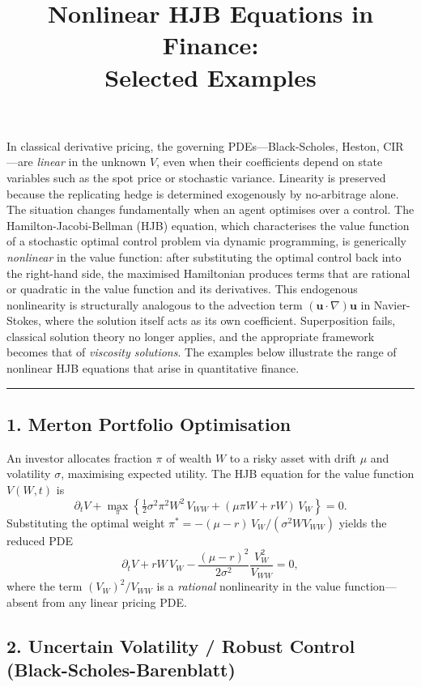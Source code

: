 \documentclass[11pt,a4paper]{article}
\title{\textbf{Nonlinear HJB Equations in Finance:\\Selected Examples}}
\author{}
\date{}
\begin{document}
\maketitle
\thispagestyle{empty}
\vspace{-1.5em}

\noindent
In classical derivative pricing, the governing PDEs---Black-Scholes, Heston, CIR---are \emph{linear} in the
unknown $V$, even when their coefficients depend on state variables such as the spot price or stochastic
variance. Linearity is preserved because the replicating hedge is determined exogenously by no-arbitrage
alone. The situation changes fundamentally when an agent optimises over a control. The Hamilton-Jacobi-Bellman
(HJB) equation, which characterises the value function of a stochastic optimal control problem via dynamic
programming, is generically \emph{nonlinear} in the value function: after substituting the optimal control
back into the right-hand side, the maximised Hamiltonian produces terms that are rational or quadratic in
the value function and its derivatives. This endogenous nonlinearity is structurally analogous to the
advection term $(\mathbf{u}\cdot\nabla)\mathbf{u}$ in Navier-Stokes, where the solution itself acts as its
own coefficient. Superposition fails, classical solution theory no longer applies, and the appropriate
framework becomes that of \emph{viscosity solutions}. The examples below illustrate the range of nonlinear
HJB equations that arise in quantitative finance.

\bigskip
\hrule
\bigskip

\subsection*{1. Merton Portfolio Optimisation}

An investor allocates fraction $\pi$ of wealth $W$ to a risky asset with drift $\mu$ and volatility $\sigma$,
maximising expected utility. The HJB equation for the value function $V(W,t)$ is
\[
  \partial_t V + \max_{\pi}\left\{
    \tfrac{1}{2}\sigma^2\pi^2 W^2\, V_{WW} + (\mu\pi W + rW)\,V_W
  \right\} = 0.
\]
Substituting the optimal weight $\pi^* = -(\mu - r)\,V_W / (\sigma^2 W V_{WW})$ yields the reduced PDE
\[
  \partial_t V + rW\,V_W - \frac{(\mu-r)^2}{2\sigma^2}\frac{V_W^2}{V_{WW}} = 0,
\]
where the term $(V_W)^2 / V_{WW}$ is a \emph{rational} nonlinearity in the value function---absent from
any linear pricing PDE.

\subsection*{2. Uncertain Volatility / Robust Control (Black-Scholes-Barenblatt)}
\end{document}
